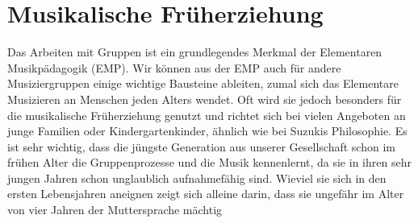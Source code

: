 \section{Musikalische Früherziehung}

Das Arbeiten mit Gruppen ist ein grundlegendes Merkmal der Elementaren
Musikpädagogik (EMP). Wir können aus der EMP auch für andere Musiziergruppen
einige wichtige Bausteine ableiten, zumal sich das Elementare Musizieren an
Menschen jeden Alters wendet.
\autocite[226]{busch:grundwissen_instrumentalpaedagogik} Oft wird sie jedoch
besonders für die musikalische Früherziehung genutzt und richtet sich bei vielen
Angeboten an junge Familien oder Kindergartenkinder, ähnlich wie bei Suzukis
Philosophie. Es ist sehr wichtig, dass die jüngste Generation aus unserer
Gesellschaft schon im frühen Alter die Gruppenprozesse und die Musik
kennenlernt, da sie in ihren sehr jungen Jahren schon unglaublich aufnahmefähig
sind. Wieviel sie sich in den ersten Lebensjahren aneignen zeigt sich alleine
darin, dass sie ungefähr im Alter von vier Jahren der Muttersprache mächtig
